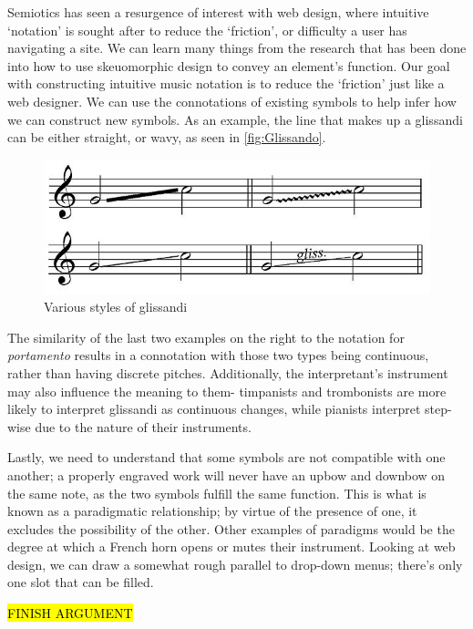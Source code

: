 Semiotics has seen a resurgence of interest with web design, where intuitive `notation' is sought after to reduce the `friction', or difficulty a user has navigating a site.
We can learn many things from the research that has been done into how to use skeuomorphic design to convey an element's function.
Our goal with constructing intuitive music notation is to reduce the `friction' just like a web designer.
We can use the connotations of existing symbols to help infer how we can construct new symbols.
As an example, the line that makes up a glissandi can be either straight, or wavy, as seen in \autoref{fig:Glissando}.
\begin{figure}
    \includegraphics[]{./resources/glissando.jpg}
\caption{Various styles of glissandi}\label{fig:Glissando}
\end{figure}
The similarity of the last two examples on the right to the notation for \emph{portamento} results in a connotation with those two types being continuous, rather than having discrete pitches.
Additionally, the interpretant's instrument may also influence the meaning to them- timpanists and trombonists are more likely to interpret glissandi as continuous changes, while pianists interpret step-wise due to the nature of their instruments.\autocite[]{}

Lastly, we need to understand that some symbols are not compatible with one another; a properly engraved work will never have an upbow and downbow on the same note, as the two symbols fulfill the same function.
This is what is known as a paradigmatic relationship; by virtue of the presence of one, it excludes the possibility of the other.
Other examples of paradigms would be the degree at which a French horn opens or mutes their instrument.
Looking at web design, we can draw a somewhat rough parallel to drop-down menus; there's only one slot that can be filled.

\hl{FINISH ARGUMENT}
